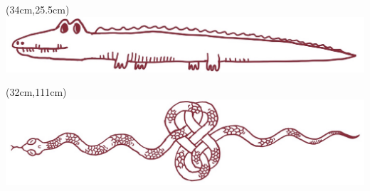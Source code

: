\documentclass[xcolor=table]{beamer}
\begin{document}
\begin{frame}[t]
\begin{textblock*}{\textwidth}
\end{textblock*}
\begin{textblock*}{\textwidth}(34cm,25.5cm)
\includegraphics[scale=0.29]{pic/croc.png}
\end{textblock*}
\begin{textblock*}{\textwidth}(32cm,111cm)
\includegraphics[scale=0.40]{pic/snake.png}
\end{textblock*}


\end{frame}
\end{document}
